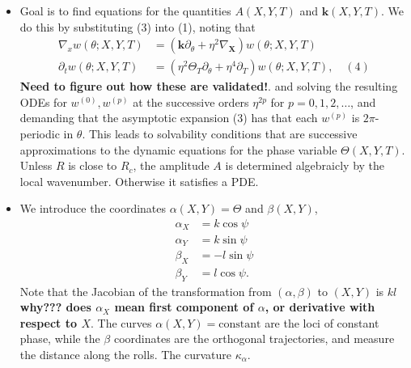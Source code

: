 \documentclass[12pt]{article}
\begin{document}
\begin{itemize}
    \item Goal is to find equations for the quantities $A(X,Y,T)$ and $\bm{k}(X,Y,T)$. We do this by substituting (3) into (1), noting that
        \begin{align*}
            \nabla_x w(\theta ; X,Y,T) &= (\bm{k}\partial_\theta + \eta^2 \nabla_{\bm{X}})w(\theta;X,Y,T)\\
            \partial_t w(\theta; X,Y,T) &= (\eta^2\Theta_T\partial_\theta +\eta^4\partial_T)w(\theta;X,Y,T), \quad (4)
        \end{align*}
        \textbf{Need to figure out how these are validated!}.
        and solving the resulting ODEs for $w^{(0)}, w^{(p)}$ at the successive orders $\eta^{2p}$ for $p=0,1,2,\dots$, and demanding that the asymptotic expansion (3) has that each $w^{(p)}$ is $2\pi$-periodic in $\theta$. This leads to solvability conditions that are successive approximations to the dynamic equations for the phase variable $\Theta(X,Y,T)$. Unless $R$ is close to $R_c$, the amplitude $A$ is determined algebraicly by the local wavenumber. Otherwise it satisfies a PDE.
    \item We introduce the coordinates $\alpha(X,Y)=\Theta$ and $\beta(X,Y)$,
        \begin{align*}
            \alpha_X &= k\cos\psi\\
            \alpha_Y &= k\sin\psi\\
            \beta_X &= -l\sin\psi\\
            \beta_Y &= l\cos\psi.
        \end{align*}
        Note that the Jacobian of the transformation from $(\alpha,\beta)$ to $(X,Y)$ is $kl$ \textbf{why??? does $\alpha_X$ mean first component of $\alpha$, or derivative with respect to $X$}.\newline
        The curves $\alpha(X,Y)=\text{constant}$ are the loci of constant phase, while the $\beta$ coordinates are the orthogonal trajectories, and measure the distance along the rolls. The curvature $\kappa_{\alpha}$.


\end{itemize}
\end{document}
